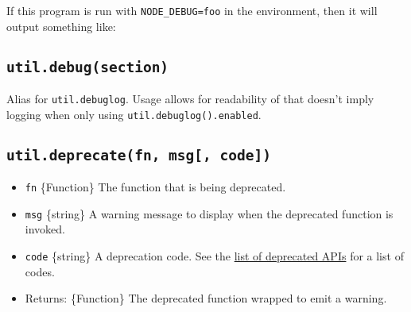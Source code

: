 \begin{Shaded}
\begin{Highlighting}[]
\OperatorTok{=} \NormalTok{(}\NormalTok{)}\OperatorTok{;}
\OperatorTok{=}\NormalTok{(}\NormalTok{)}\OperatorTok{;}
  \NormalTok{(}\OperatorTok{,} \NormalTok{)}\OperatorTok{;}
\NormalTok{\}}
\end{Highlighting}
\end{Shaded}

If this program is run with \texttt{NODE\_DEBUG=foo} in the environment,
then it will output something like:

\begin{Shaded}
\begin{Highlighting}[]
\end{Highlighting}
\end{Shaded}

\subsection{\texorpdfstring{\texttt{util.debug(section)}}{util.debug(section)}}\label{util.debugsection}

Alias for \texttt{util.debuglog}. Usage allows for readability of that
doesn't imply logging when only using \texttt{util.debuglog().enabled}.

\subsection{\texorpdfstring{\texttt{util.deprecate(fn,\ msg{[},\ code{]})}}{util.deprecate(fn, msg{[}, code{]})}}\label{util.deprecatefn-msg-code}

\begin{itemize}
\tightlist
\item
  \texttt{fn} \{Function\} The function that is being deprecated.
\item
  \texttt{msg} \{string\} A warning message to display when the
  deprecated function is invoked.
\item
  \texttt{code} \{string\} A deprecation code. See the
  \href{deprecations.md\#list-of-deprecated-apis}{list of deprecated
  APIs} for a list of codes.
\item
  Returns: \{Function\} The deprecated function wrapped to emit a
  warning.
\end{itemize}

